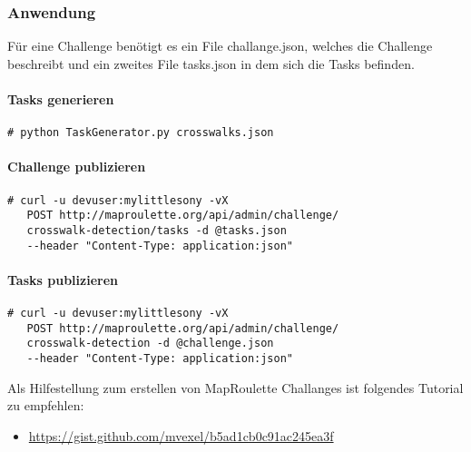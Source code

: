 \subsubsection{Anwendung}
Für eine Challenge benötigt es ein File challange.json, welches die Challenge beschreibt und ein zweites File tasks.json in dem sich die Tasks befinden.\\

\paragraph{Tasks generieren}
\begin{lstlisting}[style=BashInputStyle]
 # python TaskGenerator.py crosswalks.json
\end{lstlisting}

\paragraph{Challenge publizieren}
\begin{lstlisting}[style=BashInputStyle]
 # curl -u devuser:mylittlesony -vX 
   POST http://maproulette.org/api/admin/challenge/
   crosswalk-detection/tasks -d @tasks.json 
   --header "Content-Type: application:json"
\end{lstlisting}

\paragraph{Tasks publizieren}
\begin{lstlisting}[style=BashInputStyle]
 # curl -u devuser:mylittlesony -vX 
   POST http://maproulette.org/api/admin/challenge/
   crosswalk-detection -d @challenge.json 
   --header "Content-Type: application:json"
\end{lstlisting}


Als Hilfestellung zum erstellen von MapRoulette Challanges ist folgendes Tutorial zu empfehlen:
\begin{itemize}
	\item \url{https://gist.github.com/mvexel/b5ad1cb0c91ac245ea3f}
\end{itemize}